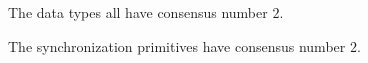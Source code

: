 \begin{frame}{}
\end{frame}

\begin{frame}{}
  \begin{theorem}
    The data types 
    all have consensus number $2$.
  \end{theorem}

  \vspace{0.50cm}
  \begin{theorem}
    The synchronization primitives 
    have consensus number $2$.
  \end{theorem}
\end{frame}


